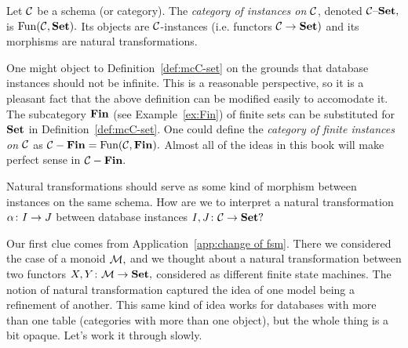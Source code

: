 \documentclass[CT4S-EN-RU]{subfiles}
\begin{document}
\begin{blockRUS}
\end{blockRUS}

\begin{definitionENG}\label{def:mcC-set}
Let $\mathcal{C}$ be a schema (or category). The {\em category of instances on $\mathcal{C}$}, denoted $\mathcal{C}{\text \textendash}{\mathbf{Set}},$ is $\textnormal{Fun}(\mathcal{C},{\mathbf{Set}}).$ Its objects are $\mathcal{C}$-instances (i.e. functors $\mathcal{C}\rightarrow{\mathbf{Set}})$ and its morphisms are natural transformations.
\end{definitionENG}

\begin{definitionRUS}\label{def:mcC-set}
\end{definitionRUS}

\begin{remarkENG}
One might object to Definition~\ref{def:mcC-set} on the grounds that database instances should not be infinite. This is a reasonable perspective, so it is a pleasant fact that the above definition can be modified easily to accomodate it. The subcategory ${\mathbf{Fin}}$ (see Example~\ref{ex:Fin}) of finite sets can be substituted for ${\mathbf{Set}}$ in Definition~\ref{def:mcC-set}. One could define the {\em category of finite instances on $\mathcal{C}$} as $\mathcal{C}-{\mathbf{Fin}}=\textnormal{Fun}(\mathcal{C},{\mathbf{Fin}}).$ Almost all of the ideas in this book will make perfect sense in $\mathcal{C}-{\mathbf{Fin}}.$
\end{remarkENG}

\begin{remarkRUS}
\end{remarkRUS}

\begin{blockENG}
Natural transformations should serve as some kind of morphism between instances on the same schema. How are we to interpret a natural transformation $\alpha\colon I\rightarrow J$ between database instances $I,J\colon\mathcal{C}\rightarrow{\mathbf{Set}}?$ 
\end{blockENG}

\begin{blockRUS}
\end{blockRUS}

\begin{blockENG}
Our first clue comes from Application~\ref{app:change of fsm}. There we considered the case of a monoid $\mathcal{M},$ and we thought about a natural transformation between two functors $X,Y\colon\mathcal{M}\rightarrow{\mathbf{Set}},$ considered as different finite state machines. The notion of natural transformation captured the idea of one model being a refinement of another. This same kind of idea works for databases with more than one table (categories with more than one object), but the whole thing is a bit opaque. Let's work it through slowly.
\end{blockENG}
\end{document}
